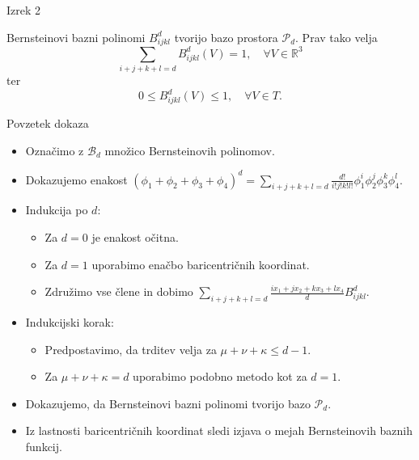 \documentclass{beamer}
\begin{document}
\begin{frame}{Izrek 2}
\begin{theorem}\label{izrek_bernstein}
    Bernsteinovi bazni polinomi $B_{ijkl}^d$ tvorijo bazo prostora $\mathcal{P}_d$.
    Prav tako velja 
    \begin{equation}\label{eq_partcija_enote}
        \sum_{i+j+k+l = d} B_{ijkl}^d(V) = 1, \quad \forall V \in \mathbb{R}^3     
    \end{equation}
    ter
    \begin{equation}
        0 \leq B_{ijkl}^d(V) \leq 1, \quad \forall V \in T.
    \end{equation}
\end{theorem}
\end{frame}

\begin{frame}{Povzetek dokaza}
    \begin{itemize}
        \item Označimo z $\mathcal{B}_d$ množico Bernsteinovih polinomov.
        \item Dokazujemo enakost $\left( \phi_1 + \phi_2 + \phi_3 + \phi_4 \right)^d = \sum_{i+j+k+l = d} \frac{d!}{i!j!k!l!} \phi_1^i \phi_2^j \phi_3^k \phi_4^l$.
        \item Indukcija po $d$:
        \begin{itemize}
            \item Za $d = 0$ je enakost očitna.
            \item Za $d = 1$ uporabimo enačbo baricentričnih koordinat.
            \item Združimo vse člene in dobimo $\sum_{i+j+k+l = d} \frac{ix_1 + jx_2 + k x_3 + l x_4}{d} B_{ijkl}^d$.
        \end{itemize}
        \item Indukcijski korak:
        \begin{itemize}
            \item Predpostavimo, da trditev velja za $\mu + \nu + \kappa \leq d-1$.
            \item Za $\mu + \nu + \kappa = d$ uporabimo podobno metodo kot za $d = 1$.
        \end{itemize}
        \item Dokazujemo, da Bernsteinovi bazni polinomi tvorijo bazo $\mathcal{P}_d$.
        \item Iz lastnosti baricentričnih koordinat sledi izjava o mejah Bernsteinovih baznih funkcij.
    \end{itemize}
\end{frame}
\end{document}
